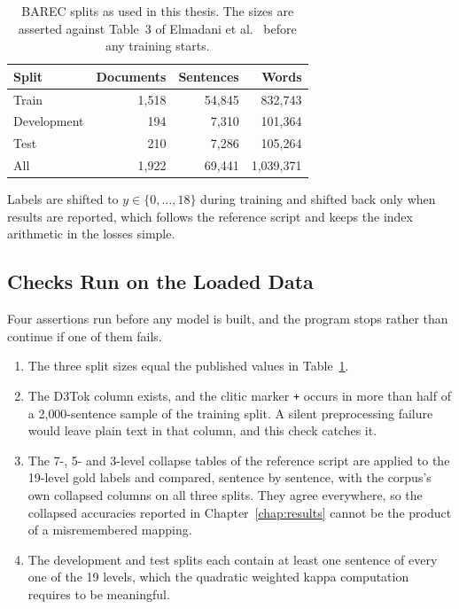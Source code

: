 \begin{table}[H]
\centering
\caption{BAREC splits as used in this thesis. The sizes are asserted against Table~3 of
Elmadani et al.~\cite{elmadani2025barec} before any training starts.}
\label{tab:meth-splits}
\begin{tabular}{lrrr}
\toprule
\textbf{Split} & \textbf{Documents} & \textbf{Sentences} & \textbf{Words} \\
\midrule
Train       & 1{,}518 & 54{,}845 & 832{,}743 \\
Development &   194 &  7{,}310 & 101{,}364 \\
Test        &   210 &  7{,}286 & 105{,}264 \\
\midrule
All         & 1{,}922 & 69{,}441 & 1{,}039{,}371 \\
\bottomrule
\end{tabular}
\end{table}

Labels are shifted to $y \in \{0,\dots,18\}$ during training and shifted back only when results
are reported, which follows the reference script and keeps the index arithmetic in the losses
simple.

\subsection{Checks Run on the Loaded Data}

Four assertions run before any model is built, and the program stops rather than continue if
one of them fails.

\begin{enumerate}
\item The three split sizes equal the published values in Table~\ref{tab:meth-splits}.
\item The D3Tok column exists, and the clitic marker \texttt{+} occurs in more than half of a
2{,}000-sentence sample of the training split. A silent preprocessing failure would leave plain
text in that column, and this check catches it.
\item The 7-, 5- and 3-level collapse tables of the reference script are applied to the
19-level gold labels and compared, sentence by sentence, with the corpus's own collapsed
columns on all three splits. They agree everywhere, so the collapsed accuracies reported in
Chapter~\ref{chap:results} cannot be the product of a misremembered mapping.
\item The development and test splits each contain at least one sentence of every one of the 19
levels, which the quadratic weighted kappa computation requires to be meaningful.
\end{enumerate}

